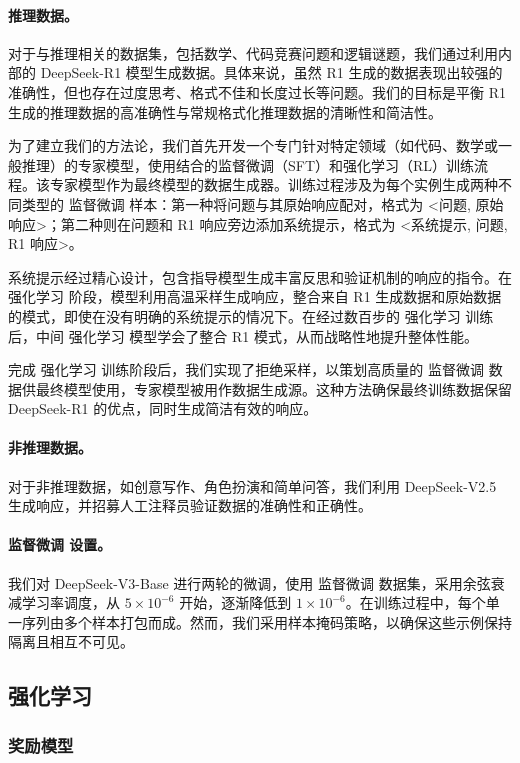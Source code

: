 \documentclass[lang=cn,a4paper,newtx]{elegantpaper}
\newcommand{\dsviii}{DeepSeek-V3}
\begin{document}
\paragraph{推理数据。}
对于与推理相关的数据集，包括数学、代码竞赛问题和逻辑谜题，我们通过利用内部的 DeepSeek-R1 模型生成数据。具体来说，虽然 R1 生成的数据表现出较强的准确性，但也存在过度思考、格式不佳和长度过长等问题。我们的目标是平衡 R1 生成的推理数据的高准确性与常规格式化推理数据的清晰性和简洁性。

为了建立我们的方法论，我们首先开发一个专门针对特定领域（如代码、数学或一般推理）的专家模型，使用结合的监督微调（SFT）和强化学习（RL）训练流程。该专家模型作为最终模型的数据生成器。训练过程涉及为每个实例生成两种不同类型的 监督微调 样本：第一种将问题与其原始响应配对，格式为 <问题, 原始响应>；第二种则在问题和 R1 响应旁边添加系统提示，格式为 <系统提示, 问题, R1 响应>。

系统提示经过精心设计，包含指导模型生成丰富反思和验证机制的响应的指令。在 强化学习 阶段，模型利用高温采样生成响应，整合来自 R1 生成数据和原始数据的模式，即使在没有明确的系统提示的情况下。在经过数百步的 强化学习 训练后，中间 强化学习 模型学会了整合 R1 模式，从而战略性地提升整体性能。

完成 强化学习 训练阶段后，我们实现了拒绝采样，以策划高质量的 监督微调 数据供最终模型使用，专家模型被用作数据生成源。这种方法确保最终训练数据保留 DeepSeek-R1 的优点，同时生成简洁有效的响应。

\paragraph{非推理数据。}
对于非推理数据，如创意写作、角色扮演和简单问答，我们利用 DeepSeek-V2.5 生成响应，并招募人工注释员验证数据的准确性和正确性。

\paragraph{监督微调 设置。}
我们对 \dsviii{}-Base 进行两轮的微调，使用 监督微调 数据集，采用余弦衰减学习率调度，从 $5 \times 10^{-6}$ 开始，逐渐降低到 $1 \times 10^{-6}$。在训练过程中，每个单一序列由多个样本打包而成。然而，我们采用样本掩码策略，以确保这些示例保持隔离且相互不可见。

\subsection{强化学习}

\subsubsection{奖励模型}
\end{document}
